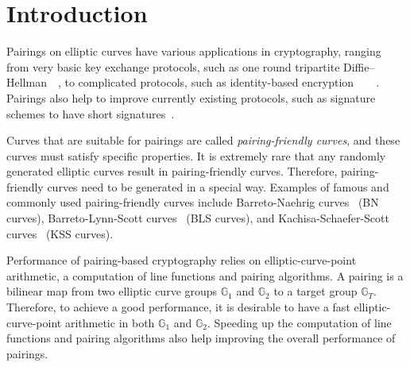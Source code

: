 %
%
%
%
%
%
%
%
%
%

\section{Introduction}
\label{sec:intro}

Pairings on elliptic curves have various applications in cryptography,
ranging from very basic key exchange protocols,
such as one round tripartite Diffie--Hellman~\cite{2000/joux-ants}~\cite{2004/joux-tripartite},
to complicated protocols, such as
identity-based encryption~\cite{2001/boneh}~\cite{2002/horwitz}~\cite{2002/gentry}~\cite{2005/sahai}.
Pairings also help to improve currently existing protocols, 
such as signature schemes to have short signatures~\cite{2004/boneh}.

Curves that are suitable for pairings are called {\emph{pairing-friendly curves}},
and these curves must satisfy specific properties.
It is extremely rare that any randomly generated elliptic curves result in pairing-friendly curves.
Therefore, pairing-friendly curves need to be generated in a special way.
Examples of famous and commonly used pairing-friendly curves include 
Barreto-Naehrig curves~\cite{2006/barreto} (BN curves),
Barreto-Lynn-Scott curves~\cite{2003/bls} (BLS curves), and
Kachisa-Schaefer-Scott curves~\cite{2008/kss} (KSS curves).

Performance of pairing-based cryptography relies on
elliptic-curve-point arithmetic, a computation of line functions and pairing algorithms.
A pairing is a bilinear map from two elliptic curve groups $\mathbb{G}_1$ and $\mathbb{G}_2$ to
a target group $\mathbb{G}_T$.
Therefore, to achieve a good performance,
it is desirable to have a fast elliptic-curve-point arithmetic in both $\mathbb{G}_1$ and $\mathbb{G}_2$.
Speeding up the computation of line functions and pairing algorithms also help improving the overall performance of pairings.

